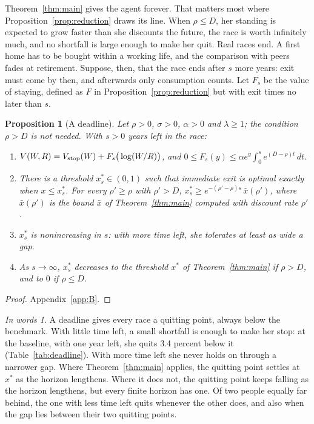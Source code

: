 \documentclass[12pt]{article}
\newtheorem{proposition}{Proposition}
\theoremstyle{definition}
\theoremstyle{remark}
\newtheorem*{inwords}{In words}
\theoremstyle{plain}
\theoremstyle{definition}
\begin{document}
Theorem~\ref{thm:main} gives the agent forever. That matters most where Proposition~\ref{prop:reduction} draws its line. When $\rho\le D$, her standing is expected to grow faster than she discounts the future, the race is worth infinitely much, and no shortfall is large enough to make her quit. Real races end. A first home has to be bought within a working life, and the comparison with peers fades at retirement. Suppose, then, that the race ends after $s$ more years: exit must come by then, and afterwards only consumption counts. Let $F_s$ be the value of staying, defined as $F$ in Proposition~\ref{prop:reduction} but with exit times no later than $s$.

\begin{proposition}[A deadline]\label{prop:deadline}
Let $\rho>0$, $\sigma>0$, $\alpha>0$ and $\lambda\ge1$; the condition $\rho>D$ is not needed. With $s>0$ years left in the race:
\begin{enumerate}[label=(\alph*)]
\item $V(W,R)=V_{\rm stop}(W)+F_s\big(\log(W/R)\big)$, and $0\le F_s(y)\le\alpha e^y\int_0^s e^{(D-\rho)t}\,dt$.
\item There is a threshold $x^*_s\in(0,1)$ such that immediate exit is optimal exactly when $x\le x^*_s$. For every $\rho'\ge\rho$ with $\rho'>D$, $x^*_s\ge e^{-(\rho'-\rho)s}\,\bar x(\rho')$, where $\bar x(\rho')$ is the bound $\bar x$ of Theorem~\ref{thm:main} computed with discount rate $\rho'$.
\item $x^*_s$ is nonincreasing in $s$: with more time left, she tolerates at least as wide a gap.
\item As $s\to\infty$, $x^*_s$ decreases to the threshold $x^*$ of Theorem~\ref{thm:main} if $\rho>D$, and to $0$ if $\rho\le D$.
\end{enumerate}
\end{proposition}

\begin{proof}
Appendix~\ref{app:B}.
\end{proof}

\begin{inwords}
A deadline gives every race a quitting point, always below the benchmark. With little time left, a small shortfall is enough to make her stop: at the baseline, with one year left, she quits 3.4 percent below it (Table~\ref{tab:deadline}). With more time left she never holds on through a narrower gap. Where Theorem~\ref{thm:main} applies, the quitting point settles at $x^*$ as the horizon lengthens. Where it does not, the quitting point keeps falling as the horizon lengthens, but every finite horizon has one. Of two people equally far behind, the one with less time left quits whenever the other does, and also when the gap lies between their two quitting points.
\end{inwords}
\end{document}
